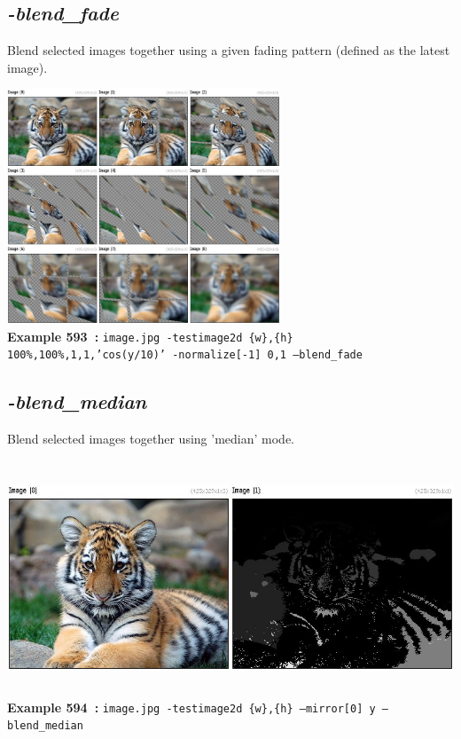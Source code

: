 \documentclass[a4paper,11pt,twoside]{book}
\begin{document}
\subsection{\emph{-blend\_fade} }\vspace*{-0.5em}
Blend selected images together using a given fading pattern (defined as the latest image).
\begin{center}\includegraphics[keepaspectratio=true,height=7cm,width=\textwidth]{img/gmic_def593.jpg}\\
{\footnotesize \textbf{Example 593~:} \texttt{image.jpg -testimage2d \{w\},\{h\} 100\%,100\%,1,1,'cos(y/10)' -normalize[-1] 0,1 --blend\_fade}}
\end{center}

\subsection{\emph{-blend\_median} }\vspace*{-0.5em}
Blend selected images together using 'median' mode.
\begin{center}\includegraphics[keepaspectratio=true,height=7cm,width=\textwidth]{img/gmic_def594.jpg}\\
{\footnotesize \textbf{Example 594~:} \texttt{image.jpg -testimage2d \{w\},\{h\} --mirror[0] y --blend\_median}}
\end{center}
\end{document}
